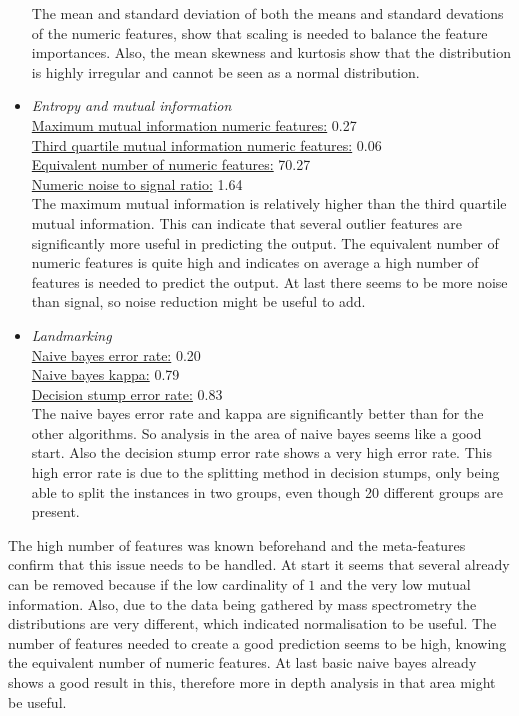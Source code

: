 \documentclass[10pt,a4paper]{article}
\begin{document}
\begin{itemize}
		The mean and standard deviation of both the means and standard devations of the numeric features, show that scaling is needed to balance the feature importances. Also, the mean skewness and kurtosis show that the distribution is highly irregular and cannot be seen as a normal distribution.
		
		\item \textit{Entropy and mutual information} \\
		\underline{Maximum mutual information numeric features:} 0.27 \\
		\underline{Third quartile mutual information numeric features:} 0.06 \\
		\underline{Equivalent number of numeric features:} 70.27 \\
		\underline{Numeric noise to signal ratio:} 1.64 \\
		
		The maximum mutual information is relatively higher than the third quartile mutual information. This can indicate that several outlier features are significantly more useful in predicting the output. The equivalent number of numeric features is quite high and indicates on average a high number of features is needed to predict the output. At last there seems to be more noise than signal, so noise reduction might be useful to add.
		
		\item \textit{Landmarking} \\
		\underline{Naive bayes error rate:} 0.20 \\
		\underline{Naive bayes kappa:} 0.79 \\
		\underline{Decision stump error rate:} 0.83 \\		

		The naive bayes error rate and kappa are significantly better than for the other algorithms. So analysis in the area of naive bayes seems like a good start. Also the decision stump error rate shows a very high error rate. This high error rate is due to the splitting method in decision stumps, only being able to split the instances in two groups, even though 20 different groups are present.
	\end{itemize}

	The high number of features was known beforehand and the meta-features confirm that this issue needs to be handled. At start it seems that several already can be removed because if the low cardinality of $1$ and the very low mutual information. Also, due to the data being gathered by mass spectrometry the distributions are very different, which indicated normalisation to be useful. The number of features needed to create a good prediction seems to be high, knowing the equivalent number of numeric features. At last basic naive bayes already shows a good result in this, therefore more in depth analysis in that area might be useful.
	
\end{document}
